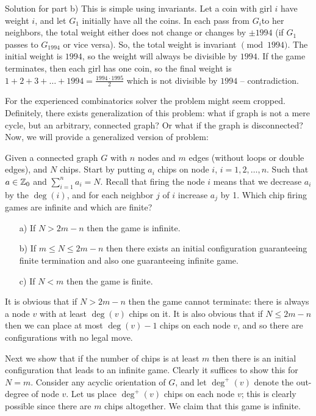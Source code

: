 Solution for part b) This is simple using invariants. Let a coin with girl $i$ have weight $i$, and let $G_1$ initially have all the coins. In each pass from $G_i$to her neighbors, the total weight either does not change or changes by $\pm 1994$ (if $G_1$ passes to $G_{1994}$ or vice versa). So, the total weight is invariant $\pmod{1994}$. The initial weight is $1994$, so the weight will always be divisible by $1994$. If the game terminates, then each girl has one coin, so the final weight is $1+2+3+\dots+1994 = \frac{1994\cdot1995}{2}$ which is not divisible by $1994$ -- contradiction.

For the experienced combinatorics solver the problem might seem cropped. Definitely, there exists generalization of this problem: what if graph is not a mere cycle, but an arbitrary, connected graph? Or what if the graph is disconnected? Now, we will provide a generalized version of problem:

\begin{example}
    Given a connected graph $G$ with $n$ nodes and $m$ edges (without loops or double edges), and $N$ chips. Start by putting $a_i$ chips on node $i$, $i=1, 2, \dots, n$. Such that $a \in \mathbb Z_0$ and $\displaystyle\sum_{i=1}^n a_i = N$. Recall that firing the node $i$ means that we decrease $a_i$ by the $\deg(i)$, and for each neighbor $j$ of $i$ increase $a_j$ by 1. Which chip firing games are infinite and which are finite?
\end{example}

\sol 

\begin{itemize}
    \item[a)] If $N > 2m - n$ then the game is infinite.
    \item[b)] If $m \leq N \leq 2m - n$ then there exists an initial configuration guaranteeing finite termination and also one guaranteeing infinite game.
    \item[c)] If $N < m$ then the game is finite.
\end{itemize}

It is obvious that if $N > 2m-n$ then the game cannot terminate: there is always a node $v$ with at least $\deg(v)$ chips on it. It is also obvious that if $N \leq 2m-n$ then we can place at most $\deg(v)-1$ chips on each node $v$, and so there are configurations with no legal move.

Next we show that if the number of chips is at least $m$ then there is an initial configuration that leads to an infinite game. Clearly it suffices to show this for $N=m$. Consider any acyclic orientation of $G$, and let $\deg^+(v)$ denote the out-degree of node $v$. Let us place $\deg^+(v)$ chips on each node $v$; this is clearly possible since there are $m$ chips altogether. We claim that this game is infinite.

